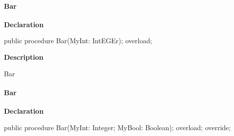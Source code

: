 \documentclass{report}
\newif\ifpdf
\begin{document}
\paragraph*{Bar}\hspace*{\fill}

\label{ok_link_tag_overloads.TOverloadedMethods-Bar}
\begin{list}{}{
\setlength{\itemindent}{0cm}
\setlength{\listparindent}{0cm}
\setlength{\leftmargin}{\evensidemargin}
\addtolength{\leftmargin}{\tmplength}
\settowidth{\labelsep}{X}
\addtolength{\leftmargin}{\labelsep}
\setlength{\labelwidth}{\tmplength}
}
\item[\textbf{Declaration}\hfill]
\ifpdf
\begin{flushleft}
\fi
\begin{ttfamily}
public procedure Bar(MyInt: IntEGEr); overload;\end{ttfamily}

\ifpdf
\end{flushleft}
\fi

\par
\item[\textbf{Description}]
\begin{ttfamily}Bar\end{ttfamily}

\end{list}
\paragraph*{Bar}\hspace*{\fill}

\label{ok_link_tag_overloads.TOverloadedMethods-Bar}
\begin{list}{}{
\setlength{\itemindent}{0cm}
\setlength{\listparindent}{0cm}
\setlength{\leftmargin}{\evensidemargin}
\addtolength{\leftmargin}{\tmplength}
\settowidth{\labelsep}{X}
\addtolength{\leftmargin}{\labelsep}
\setlength{\labelwidth}{\tmplength}
}
\item[\textbf{Declaration}\hfill]
\ifpdf
\begin{flushleft}
\fi
\begin{ttfamily}
public procedure Bar(MyInt: Integer; MyBool: Boolean); overload; override;\end{ttfamily}

\ifpdf
\end{flushleft}
\fi

\end{list}
\end{document}
